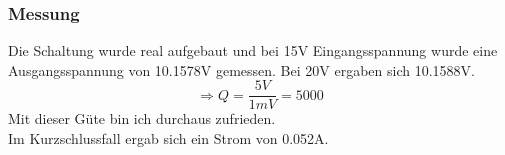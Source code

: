\subsubsection*{Messung}
Die Schaltung wurde real aufgebaut und bei 15V Eingangsspannung wurde eine Ausgangsspannung von 10.1578V gemessen. Bei 20V ergaben sich 10.1588V.
\[ \Rightarrow Q=\frac{5V}{1mV} = 5000 \]
Mit dieser Güte bin ich durchaus zufrieden.\\
Im Kurzschlussfall ergab sich ein Strom von 0.052A.


































